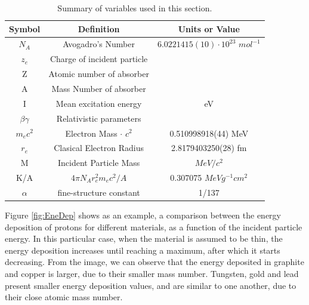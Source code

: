 \begin{table}[h!]
    \centering
    \begin{tabular}{ccc}
    \hline
    \textbf{Symbol}                  & \textbf{Definition}                  & \textbf{Units or Value}                                               \\ \hline
    $N_A$                      & Avogadro's Number           & $6.0221415(10)\cdot10^23$ $mol^{-1}$ \\
    $z_e$                      & Charge of incident particle &                                                              \\
    Z                       & Atomic number of absorber   &                                                              \\
    A                       & Mass Number of absorber     &                                                              \\
    I                       & Mean excitation energy      & eV                                                           \\
    $\beta \gamma$              & Relativistic parameters     &                                                              \\
    $m_e c^2$ & Electron Mass $\cdot$ $c^2$          & 0.510998918(44) MeV                                          \\
    $r_e$                      & Clasical Electron Radius    & 2.8179403250(28) fm                                          \\
    M                       & Incident Particle Mass      & $MeV/c^2$\\
    
    K/A                     & $4 \pi N_A r_e^2 m_e c^2/A$ & 0.307075 $MeV g^{-1} cm^2$  \\
     $\alpha$ & fine-structure constant & 1/137 \\ 
     \hline
    \end{tabular}
    \caption{Summary of variables used in this section.}
    \label{tab:ParBethe}
\end{table}

 Figure \ref{fig:EneDep} shows as an example, a comparison between the energy deposition of protons for different materials, as a function of the incident particle energy.  In this particular case, when the material is assumed to be thin, the energy deposition increases until reaching a maximum, after which it starts decreasing. From the image, we can observe that the energy deposited in graphite and copper is larger, due to their smaller mass number. Tungsten, gold and lead present smaller energy deposition values, and are similar to one another, due to their close atomic mass number. 

